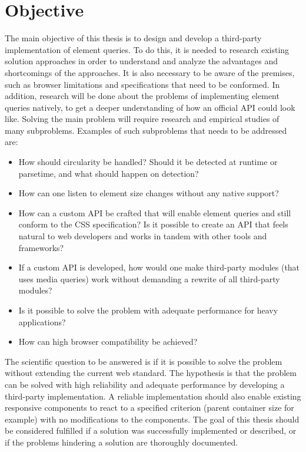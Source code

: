 \documentclass[a4paper,11pt]{kth-mag}
\newcommand\abbr[2][]{\uppercase{#2}\ifthenelse{\equal{#1}{}}%
                     {}{#1}}
\begin{document}
    \section{Objective}
      The main objective of this thesis is to design and develop a third-party implementation of element queries.
      To do this, it is needed to research existing solution approaches in order to understand and analyze the advantages and shortcomings of the approaches.
      It is also necessary to be aware of the premises, such as browser limitations and specifications that need to be conformed.
      In addition, research will be done about the problems of implementing element queries natively, to get a deeper understanding of how an official \abbr{api} could look like.
      Solving the main problem will require research and empirical studies of many subproblems.
      Examples of such subproblems that needs to be addressed are:
      \begin{itemize}
        \item How should circularity be handled? Should it be detected at runtime or parsetime, and what should happen on detection?
        \item How can one listen to element size changes without any native support?
        \item How can a custom \abbr{api} be crafted that will enable element queries and still conform to the \abbr{css} specification? Is it possible to create an API that feels natural to web developers and works in tandem with other tools and frameworks?
        \item If a custom \abbr{api} is developed, how would one make third-party modules (that uses media queries) work without demanding a rewrite of all third-party modules? 
        \item Is it possible to solve the problem with adequate performance for heavy applications?
        \item How can high browser compatibility be achieved?
      \end{itemize}
      The scientific question to be answered is if it is possible to solve the problem  without extending the current web standard.
      The hypothesis is that the problem can be solved with high reliability and adequate performance by developing a third-party implementation.
      A reliable implementation should also enable existing responsive components to react to a specified criterion (parent container size for example) with no modifications to the components.
      The goal of this thesis should be considered fulfilled if a solution was successfully implemented or described, or if the problems hindering a solution are thoroughly documented.
\end{document}
